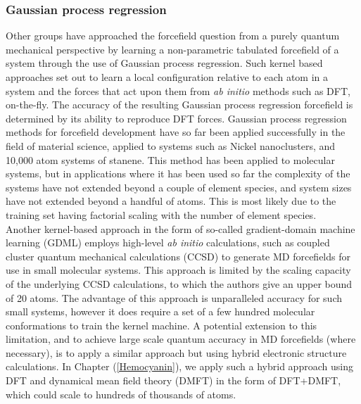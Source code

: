 \subsubsection{Gaussian process regression}
Other groups have approached the forcefield question from a purely quantum mechanical perspective by learning a non-parametric tabulated forcefield of a system through the use of Gaussian process regression.\cite{zeni2018building, bartok2010gaussian, Vandermause2020} Such kernel based approaches set out to learn a local configuration relative to each atom in a system and the forces that act upon them from \textit{ab initio} methods such as DFT, on-the-fly. The accuracy of the resulting Gaussian process regression forcefield is determined by its ability to reproduce DFT forces. Gaussian process regression methods for forcefield development have so far been applied successfully in the field of material science, applied to systems such as Nickel nanoclusters,\cite{glielmo2018efficient} and 10,000 atom systems of stanene.\cite{xie2021bayesian} This method has been applied to molecular systems, but in applications where it has been used so far the complexity of the systems have not extended beyond a couple of element species, and system sizes have not extended beyond a handful of atoms.\cite{Uteva2018, cui2016efficient} This is most likely due to the training set having factorial scaling with the number of element species.\cite{glielmo2020building} \\

Another kernel-based approach in the form of so-called gradient-domain machine learning (GDML) employs high-level \textit{ab initio} calculations, such as coupled cluster quantum mechanical calculations (CCSD) to generate MD forcefields for use in small molecular systems. This approach is limited by the scaling capacity of the underlying CCSD calculations, to which the authors give an upper bound of 20 atoms.\cite{chmiela2018towards} The advantage of this approach is unparalleled accuracy for such small systems, however it does require a set of a few hundred molecular conformations to train the kernel machine. A potential extension to this limitation, and to achieve large scale quantum accuracy in MD forcefields (where necessary), is to apply a similar approach but using hybrid electronic structure calculations. In Chapter (\ref{Hemocyanin}), we apply such a hybrid approach using DFT and dynamical mean field theory (DMFT) in the form of DFT+DMFT, which could scale to hundreds of thousands of atoms. 

